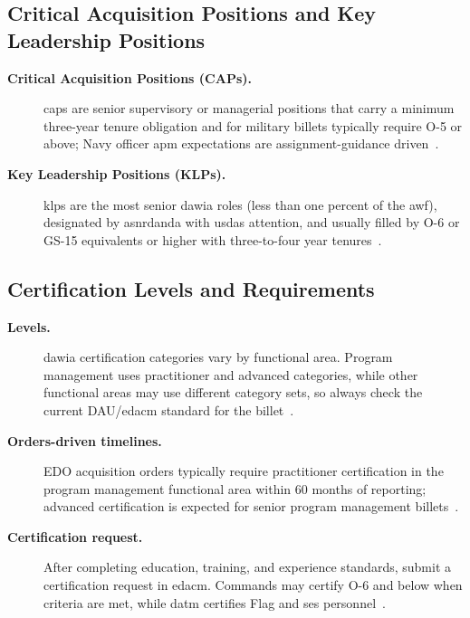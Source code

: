 \documentclass[../main.tex]{subfiles}
\begin{document}
\subsection{Critical Acquisition Positions and Key Leadership Positions}
\begin{description}
  \item[\textbf{Critical Acquisition Positions (CAPs).}] \acp{cap} are senior supervisory or managerial positions
  that carry a minimum three-year tenure obligation and for military billets typically
  require O-5 or above; Navy officer \ac{apm} expectations are assignment-guidance driven~\autocite{edo-5-2-1-dawia-2025,DoDI-5000-66-DAWIA-2022}.
  \item[\textbf{Key Leadership Positions (KLPs).}] \acp{klp} are the most senior \ac{dawia} roles (less than one
  percent of the \ac{awf}), designated by \ac{asnrdanda} with \ac{usdas} attention, and usually filled by
  O-6 or GS-15 equivalents or higher with three-to-four year tenures~\autocite{edo-5-2-1-dawia-2025}.
\end{description}

\subsection{Certification Levels and Requirements}
\begin{description}
  \item[\textbf{Levels.}] \ac{dawia} certification categories vary by functional area. Program management uses practitioner and advanced categories, while other functional areas may use different category sets, so always check the current DAU/\ac{edacm} standard for the billet~\autocite{edo-5-2-1-dawia-2025,DoDI-5000-66-DAWIA-2022}.
  \item[\textbf{Orders-driven timelines.}] EDO acquisition orders typically require practitioner certification in
  the program management functional area within 60 months of reporting; advanced certification is
  expected for senior program management billets~\autocite{edo-5-2-1-dawia-2025}.
  \item[\textbf{Certification request.}] After completing education, training, and experience standards, submit a
  certification request in \ac{edacm}. Commands may certify O-6 and below when criteria are met, while
  \ac{datm} certifies Flag and \ac{ses} personnel~\autocite{edo-5-2-1-dawia-2025}.
\end{description}
\end{document}
